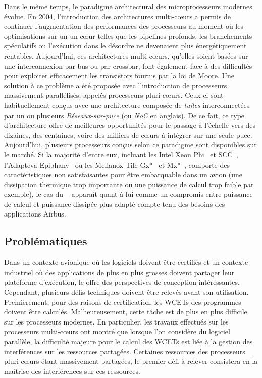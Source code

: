 \documentclass[main.tex]{subfiles}
\begin{document}
Dans le même temps, le paradigme architectural des microprocesseurs modernes évolue. En 2004, l'introduction des architectures multi-c\oe{}urs a permis de continuer l'augmentation des performances des processeurs au moment où les optimisations sur un un c\oe{}ur telles que les pipelines profonds, les branchements spéculatifs ou l'exécution dans le désordre ne devenaient plus énergétiquement rentables. Aujourd'hui, ces architectures multi-c\oe{}urs, qu'elles soient basées sur une interconnexion par bus ou par crossbar, font également face à des difficultés pour exploiter efficacement les transistors fournis par la loi de Moore. Une solution à ce problème a été proposée avec l'introduction de processeurs massivement parallélisés, appelés processeurs pluri-c\oe{}urs. Ceux-ci sont habituellement conçus avec une architecture composée de \emph{tuiles} interconnectées par un ou plusieurs \emph{Réseaux-sur-puce} (ou \emph{NoC} en anglais). De ce fait, ce type d'architecture offre de meilleures opportunités pour le passage à l'échelle vers des dizaines, des centaines, voire des milliers de c\oe{}urs à intégrer sur une seule puce. Aujourd'hui, plusieurs processeurs conçus selon ce paradigme sont disponibles sur le marché. Si la majorité d'entre eux, incluant les Intel Xeon Phi~\cite{XeonPhi} et SCC~\cite{intel_scc}, l'Adapteva Epiphany~\cite{Epiphany} ou les Mellanox Tile Gx*~\cite{TileGx} et Mx*~\cite{TileMx}, comporte des caractéristiques non satisfaisantes pour être embarquable dans un avion (une dissipation thermique trop importante ou une puissance de calcul trop faible par exemple), le cas du \mppalong~\cite{kalray_mppa} apparaît quant à lui comme un compromis entre puissance de calcul et puissance dissipée plus adapté compte tenu des besoins des applications Airbus.


\subsection{Problématiques}
Dans un contexte avionique où les logiciels doivent être certifiés et un contexte industriel où des applications de plus en plus grosses doivent partager leur plateforme d'exécution, le \mppalong offre des perspectives de conception intéressantes. Cependant, plusieurs défis techniques doivent être relevés avant son utilisation. Premièrement, pour des raisons de certification, les WCETs des programmes doivent être calculés. Malheureusement, cette tâche est de plus en plus difficile sur les processeurs modernes. En particulier, les travaux effectués sur les processeurs multi-c\oe{}urs ont montré que lorsque l'on considère du logiciel parallèle, la difficulté majeure pour le calcul des WCETs est liée à la gestion des interférences sur les ressources partagées. Certaines ressources des processeurs pluri-c\oe{}urs étant massivement partagées, le premier défi à relever consistera en la maîtrise des interférences sur ces ressources. 
\end{document}
